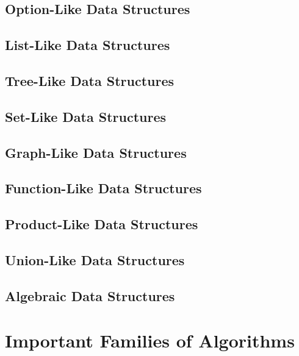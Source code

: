 \documentclass{book}
\begin{document}
\chapter{Option-Like Data Structures}\label{sec:ad:option}
 

\chapter{List-Like Data Structures}\label{sec:ad:lists}
 

\chapter{Tree-Like Data Structures}\label{sec:ad:trees}
 

\chapter{Set-Like Data Structures}\label{sec:ad:sets}
 

\chapter{Graph-Like Data Structures}\label{sec:ad:graphs}
 

\chapter{Function-Like Data Structures}\label{sec:ad:functions}
 

\chapter{Product-Like Data Structures}\label{sec:ad:products}
 

\chapter{Union-Like Data Structures}\label{sec:ad:unions}
 

\chapter{Algebraic Data Structures}\label{sec:ad:theories}
 


\part{Important Families of Algorithms}\label{sec:ad:algo}
\end{document}
